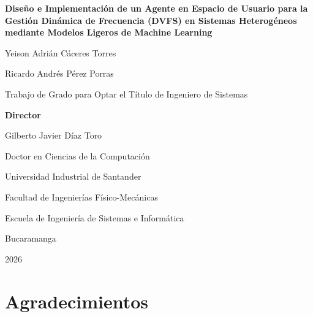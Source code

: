 

\begin{titlepage}
    \centering
    \vspace*{1cm}

    {\Large \textbf{Diseño e Implementación de un Agente en Espacio de Usuario para la Gestión Dinámica de Frecuencia (DVFS) en Sistemas Heterogéneos mediante Modelos Ligeros de Machine Learning}}

    \vspace{2cm}

    {\large Yeison Adrián Cáceres Torres}

    {\large Ricardo Andrés Pérez Porras}

    \vspace{2cm}

    {\large Trabajo de Grado para Optar el Título de Ingeniero de Sistemas}

    \vspace{2cm}

    {\large \textbf{Director}}

    {\large Gilberto Javier Díaz Toro}

    {\large Doctor en Ciencias de la Computación}

    \vspace{\fill}

    {\large Universidad Industrial de Santander}

    {\large Facultad de Ingenierías Físico-Mecánicas}

    {\large Escuela de Ingeniería de Sistemas e Informática}

    {\large Bucaramanga}

    {\large 2026}

\end{titlepage}


\chapter*{Agradecimientos}

\vspace{1cm}

